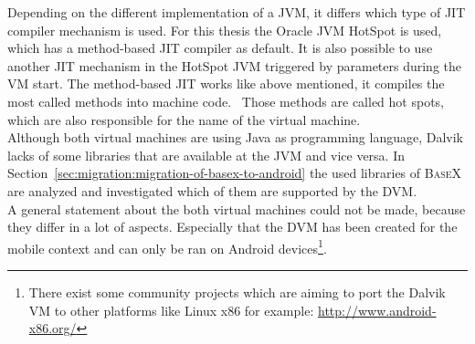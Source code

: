 Depending on the different implementation of a JVM, it differs which type of JIT compiler mechanism is used.
For this thesis the Oracle JVM HotSpot is used, which has a method-based JIT compiler as default.
It is also possible to use another JIT mechanism in the HotSpot JVM triggered by parameters during the VM start.
The method-based JIT works like above mentioned, it compiles the most called methods into machine code.~\cite{kotzmann2008design}
Those methods are called hot spots, which are also responsible for the name of the virtual machine.
\cite{paleczny2001java}
\\
Although both virtual machines are using Java as programming language, Dalvik lacks of some libraries that are available at the JVM and vice versa.
In Section~\ref{sec:migration:migration-of-basex-to-android} the used libraries of \textsc{BaseX} are analyzed and investigated which of them are supported by the DVM.\\
A general statement about the both virtual machines could not be made, because they differ in a lot of aspects.
Especially that the DVM has been created for the mobile context and can only be ran on Android devices\footnote{There exist some community projects which are aiming to port the Dalvik VM to other platforms like Linux x86 for example: \url{http://www.android-x86.org/}}.



